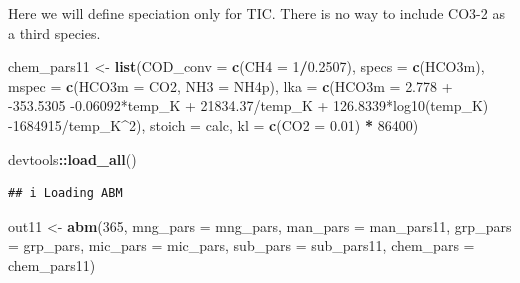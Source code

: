 \documentclass[
]{article}
\newenvironment{Shaded}{\begin{snugshade}}{\end{snugshade}}
\newcommand{\AttributeTok}[1]{\textcolor[rgb]{0.13,0.29,0.53}{#1}}
\newcommand{\DecValTok}[1]{\textcolor[rgb]{0.00,0.00,0.81}{#1}}
\newcommand{\FloatTok}[1]{\textcolor[rgb]{0.00,0.00,0.81}{#1}}
\newcommand{\FunctionTok}[1]{\textcolor[rgb]{0.13,0.29,0.53}{\textbf{#1}}}
\newcommand{\NormalTok}[1]{#1}
\newcommand{\OtherTok}[1]{\textcolor[rgb]{0.56,0.35,0.01}{#1}}
\newcommand{\SpecialCharTok}[1]{\textcolor[rgb]{0.81,0.36,0.00}{\textbf{#1}}}
\newcommand{\StringTok}[1]{\textcolor[rgb]{0.31,0.60,0.02}{#1}}
\begin{document}
Here we will define speciation only for TIC. There is no way to include
CO3-2 as a third species.

\begin{Shaded}
\begin{Highlighting}[]
\NormalTok{chem\_pars11 }\OtherTok{\textless{}{-}} \FunctionTok{list}\NormalTok{(}\AttributeTok{COD\_conv =} \FunctionTok{c}\NormalTok{(}\AttributeTok{CH4 =} \DecValTok{1}\SpecialCharTok{/}\FloatTok{0.2507}\NormalTok{),}
                     \AttributeTok{specs =} \FunctionTok{c}\NormalTok{(}\StringTok{\textquotesingle{}HCO3m\textquotesingle{}}\NormalTok{),}
                     \AttributeTok{mspec =} \FunctionTok{c}\NormalTok{(}\AttributeTok{HCO3m =} \StringTok{\textquotesingle{}CO2\textquotesingle{}}\NormalTok{, }\AttributeTok{NH3 =} \StringTok{\textquotesingle{}NH4p\textquotesingle{}}\NormalTok{),}
                     \AttributeTok{lka =} \FunctionTok{c}\NormalTok{(}\AttributeTok{HCO3m =} \StringTok{\textquotesingle{}{-}2.778 + {-}353.5305 {-}0.06092*temp\_K + 21834.37/temp\_K + 126.8339*log10(temp\_K) {-}1684915/temp\_K\^{}2\textquotesingle{}}\NormalTok{),}
                     \AttributeTok{stoich =} \StringTok{\textquotesingle{}calc\textquotesingle{}}\NormalTok{,}
                     \AttributeTok{kl =} \FunctionTok{c}\NormalTok{(}\AttributeTok{CO2 =} \FloatTok{0.01}\NormalTok{) }\SpecialCharTok{*} \DecValTok{86400}\NormalTok{)}
\end{Highlighting}
\end{Shaded}

\begin{Shaded}
\begin{Highlighting}[]
\NormalTok{devtools}\SpecialCharTok{::}\FunctionTok{load\_all}\NormalTok{()}
\end{Highlighting}
\end{Shaded}

\begin{verbatim}
## i Loading ABM
\end{verbatim}

\begin{Shaded}
\begin{Highlighting}[]
\NormalTok{out11 }\OtherTok{\textless{}{-}} \FunctionTok{abm}\NormalTok{(}\DecValTok{365}\NormalTok{,}
            \AttributeTok{mng\_pars =}\NormalTok{ mng\_pars,}
            \AttributeTok{man\_pars =}\NormalTok{ man\_pars11,}
            \AttributeTok{grp\_pars =}\NormalTok{ grp\_pars,}
            \AttributeTok{mic\_pars =}\NormalTok{ mic\_pars,}
            \AttributeTok{sub\_pars =}\NormalTok{ sub\_pars11,}
            \AttributeTok{chem\_pars =}\NormalTok{ chem\_pars11)}
\end{Highlighting}
\end{Shaded}
\end{document}
